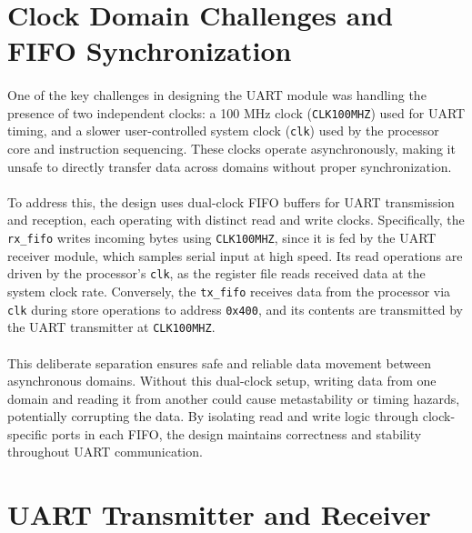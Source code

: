 \documentclass[12pt]{report}
\begin{document}
\section{Clock Domain Challenges and FIFO Synchronization}

\paragraph{}
One of the key challenges in designing the UART module was handling the presence of two independent clocks: a 100 MHz clock (\texttt{CLK100MHZ}) used for UART timing, and a slower user-controlled system clock (\texttt{clk}) used by the processor core and instruction sequencing. These clocks operate asynchronously, making it unsafe to directly transfer data across domains without proper synchronization.

\paragraph{}
To address this, the design uses dual-clock FIFO buffers for UART transmission and reception, each operating with distinct read and write clocks. Specifically, the \texttt{rx\_fifo} writes incoming bytes using \texttt{CLK100MHZ}, since it is fed by the UART receiver module, which samples serial input at high speed. Its read operations are driven by the processor's \texttt{clk}, as the register file reads received data at the system clock rate. Conversely, the \texttt{tx\_fifo} receives data from the processor via \texttt{clk} during store operations to address \texttt{0x400}, and its contents are transmitted by the UART transmitter at \texttt{CLK100MHZ}. 

\paragraph{}
This deliberate separation ensures safe and reliable data movement between asynchronous domains. Without this dual-clock setup, writing data from one domain and reading it from another could cause metastability or timing hazards, potentially corrupting the data. By isolating read and write logic through clock-specific ports in each FIFO, the design maintains correctness and stability throughout UART communication.


\section{UART Transmitter and Receiver}
\end{document}
